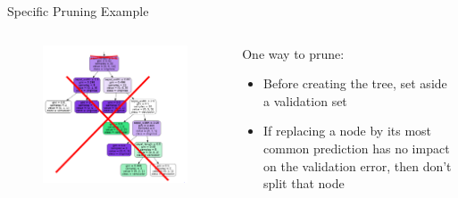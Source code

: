 \documentclass[aspectratio=169]{../latex_main/tntbeamer}  %
\begin{document}
	
	\begin{frame}{Specific Pruning Example}
	    \begin{columns}
	        \begin{column}{.5\textwidth}
	              \begin{figure}
            	        \centering
            	        \includegraphics[scale=.35]{Bild54}
	            \end{figure}  
	        \end{column}
	        
	        \begin{column}{.5\textwidth}
	                One way to prune: 
	                \begin{itemize}
	                    \item Before creating the tree, set aside a validation set
	                    \item If replacing a node by its most common prediction has no impact on the validation error, then don’t split that node
	                \end{itemize}
	        \end{column}
	    \end{columns}
	\end{frame}
	
	
\end{document}
